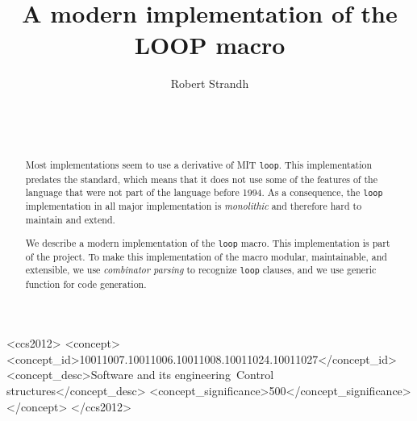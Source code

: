 \documentclass{sig-alternate-05-2015}
\def\inputtex#1{}
\def\mitloop{MIT \texttt{loop}}
\begin{document}
\title{A modern implementation of the LOOP macro}
\author{\alignauthor
Robert Strandh\\
\\
\\
\\
}

\maketitle

\begin{abstract}
Most \commonlisp{} implementations seem to use a derivative of
\mitloop{}.  This implementation predates the \commonlisp{} standard,
which means that it does not use some of the features of the language
that were not part of the language before 1994.  As a consequence, the
\texttt{loop} implementation in all major \commonlisp{} implementation
is \emph{monolithic} and therefore hard to maintain and extend.

We describe a modern implementation of the \commonlisp{} \texttt{loop}
macro.  This implementation is part of the \sicl{} project.  To make
this implementation of the macro modular, maintainable, and
extensible, we use \emph{combinator parsing} to recognize
\texttt{loop} clauses, and we use \clos{} generic function for code
generation.
\end{abstract}

\begin{CCSXML}
  <ccs2012>
  <concept>
  <concept_id>10011007.10011006.10011008.10011024.10011027</concept_id>
  <concept_desc>Software and its engineering~Control structures</concept_desc>
  <concept_significance>500</concept_significance>
  </concept>
  </ccs2012>
\end{CCSXML}


\printccsdesc


\inputtex{sec-introduction.tex}
\inputtex{sec-previous.tex}
\inputtex{sec-our-method.tex}
\inputtex{sec-benefits.tex}
\inputtex{sec-conclusions.tex}
\inputtex{sec-acknowledgments.tex}



\end{document}
